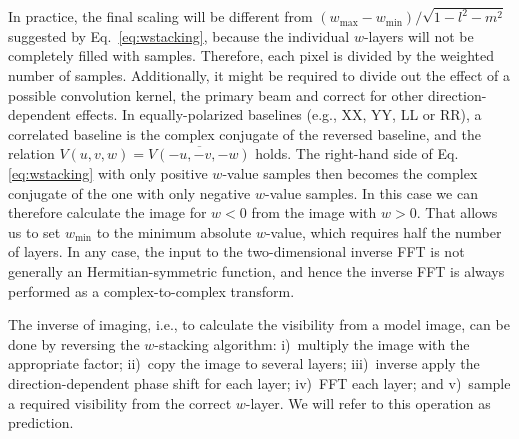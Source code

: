 \documentclass[useAMS,usenatbib]{mn2e}
\begin{document}
In practice, the final scaling will be different from $\left(w_{\max} - w_{\min}\right)/\sqrt{1-l^2-m^2}$ suggested by Eq.~\eqref{eq:wstacking}, because the individual $w$-layers will not be completely filled with samples. Therefore, each pixel is divided by the weighted number of samples. Additionally, it might be required to divide out the effect of a possible convolution kernel, the primary beam and correct for other direction-dependent effects. In equally-polarized baselines (e.g., XX, YY, LL or RR), a correlated baseline is the complex conjugate of the reversed baseline, and the relation $V(u,v,w)=\overline{V(-u,-v,-w)}$ holds. The right-hand side of Eq.\eqref{eq:wstacking} with only positive $w$-value samples then becomes the complex conjugate of the one with only negative $w$-value samples. In this case we can therefore calculate the image for $w<0$ from the image with $w>0$. That allows us to set $w_{\min}$ to the minimum absolute $w$-value, which requires half the number of layers. In any case, the input to the two-dimensional inverse FFT is not generally an Hermitian-symmetric function, and hence the inverse FFT is always performed as a complex-to-complex transform.

The inverse of imaging, i.e., to calculate the visibility from a model image, can be done by reversing the $w$-stacking algorithm: i)~multiply the image with the appropriate factor; ii)~copy the image to several layers; iii)~inverse apply the direction-dependent phase shift for each layer; iv)~FFT each layer; and v)~sample a required visibility from the correct $w$-layer. We will refer to this operation as prediction.
\end{document}
